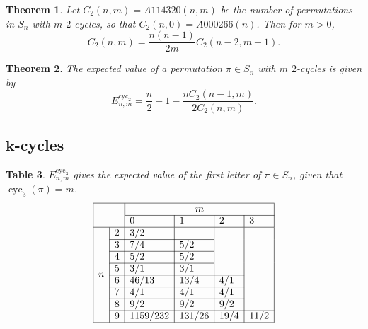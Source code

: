 \documentclass{article}
\newcommand{\n}[1]{\multicolumn{1}{|c|}{#1}}
\newtheorem{theo}{Theorem}[subsection]
\newtheorem{datatable}[theo]{Table}
\begin{document}
\begin{theo}
  Let $C_2(n,m) = A114320(n,m)$ be the number of permutations in $S_n$ with $m$ $2$-cycles, so that
  $C_2(n,0) = A000266(n)$.
  Then for $m>0$, \[
    C_2(n,m) = \frac{n(n-1)}{2m}C_2(n-2, m-1).
  \]
\end{theo}

\begin{theo}
  The expected value of a permutation $\pi \in S_n$ with $m$ $2$-cycles is given by \[
    E_{n,m}^{\text{cyc}_2} = \frac n2 + 1 - \frac{nC_2(n-1,m)}{2C_2(n,m)}.
  \]
\end{theo}

\subsection{$\boldsymbol{k}$-cycles}
\begin{datatable} $E_{n,m}^{\text{cyc}_3}$ gives the expected value of the first letter of
  $\pi \in S_n$, given that $\operatorname{cyc}_3(\pi) = m$.
\[
  \begin{array}{|ll|l|l|l|l|l|l|l|l|l|l|}
  \hline
  & & \multicolumn{4}{|c|}{m} \\ \cline{3-6}
  & & 0 & 1 & 2 & 3 \\ \hline
  \multirow{8}{*}{$n$}
  & \n{2} & 3/2      &        &      &      \\ \cline{2-4}
  & \n{3} & 7/4      & 5/2    &      &      \\ \cline{2-4}
  & \n{4} & 5/2      & 5/2    &      &      \\ \cline{2-4}
  & \n{5} & 3/1      & 3/1    &      &      \\ \cline{2-5}
  & \n{6} & 46/13    & 13/4   & 4/1  &      \\ \cline{2-5}
  & \n{7} & 4/1      & 4/1    & 4/1  &      \\ \cline{2-5}
  & \n{8} & 9/2      & 9/2    & 9/2  &      \\ \cline{2-6}
  & \n{9} & 1159/232 & 131/26 & 19/4 & 11/2 \\ \hline
  \end{array}
\]
\end{datatable}
\end{document}
